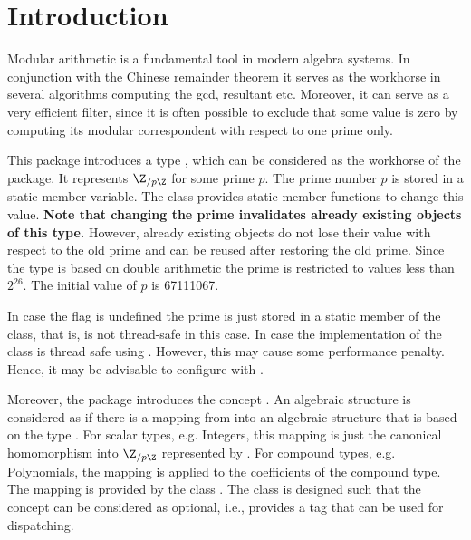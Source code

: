 \cleardoublepage
{}



\section{Introduction}

Modular arithmetic is a fundamental tool in modern algebra systems. In conjunction with the Chinese remainder theorem it serves as the workhorse in several algorithms computing the gcd, resultant etc. Moreover, it can serve as a very efficient filter, since it is often possible to exclude that some value is zero by computing its modular correspondent with respect to one prime only. 

This package introduces a type , which can be considered as 
the workhorse of the package. It represents $\Z_{/p\Z}$ for some prime $p$. 
The prime number $p$ is stored in a static member variable. 
The class provides static member functions to change this value. 
{\bf Note that changing the prime invalidates already existing objects 
of this type.}
However, already existing objects do not lose their value with respect to the 
old prime and can be reused after restoring the old prime. 
Since the type is based on double 
arithmetic the prime is restricted to values less than $2^{26}$. 
The initial value of $p$ is 67111067. 

\begin{ccAdvanced}      
In case the flag  
is undefined the prime is just stored in a static member 
of the class, that is,  is not thread-safe in this case.  
In case 
the implementation of the class is thread safe using 
. However, this may cause some performance 
penalty. Hence, it may be advisable to configure  with 
. 
\end{ccAdvanced} 

Moreover, the package introduces the concept . 
An algebraic structure  is considered as  if there 
is a mapping from  into an algebraic structure that is based on 
the type .  
For scalar types, e.g. Integers, this mapping is just the canonical 
homomorphism into $\Z_{/p\Z}$ represented by . 
For compound types, e.g. Polynomials, the mapping is applied to the 
coefficients of the compound type. 
The mapping is provided by the class .
The class  is designed such that the concept 
 can be considered as optional, i.e., 
 provides a tag that can be used for dispatching. 

